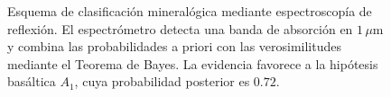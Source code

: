 \begin{figure}[htbp]
\caption{Esquema de clasificación mineralógica mediante espectroscopía de reflexión. El espectrómetro detecta una banda de absorción en $1\,\mu\mathrm{m}$ y combina las probabilidades a priori con las verosimilitudes mediante el Teorema de Bayes. La evidencia favorece a la hipótesis basáltica $A_1$, cuya probabilidad posterior es $0.72$.}
\end{figure}